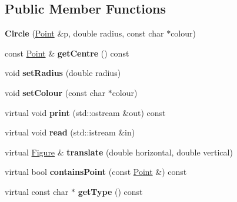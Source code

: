 \subsection*{Public Member Functions}
\begin{DoxyCompactItemize}
\item 
\mbox{\label{class_circle_a1eb7a4c2ac64b9c519539048e2f2c36b}} 
{\bfseries Circle} (\mbox{\hyperlink{struct_point}{Point}} \&p, double radius, const char $\ast$colour)
\item 
\mbox{\label{class_circle_a281c24ea848cd0f5eebfa0ca246925cc}} 
const \mbox{\hyperlink{struct_point}{Point}} \& {\bfseries get\+Centre} () const
\item 
\mbox{\label{class_circle_a7a1b334833a9f468498c804264553f41}} 
void {\bfseries set\+Radius} (double radius)
\item 
\mbox{\label{class_circle_a790c82d887375e72ad440dec8fa3fabb}} 
void {\bfseries set\+Colour} (const char $\ast$colour)
\item 
\mbox{\label{class_circle_a3b64810a362774c9951f44ecb3a0a6b2}} 
virtual void {\bfseries print} (std\+::ostream \&out) const
\item 
\mbox{\label{class_circle_aae11fbab6f6d0d9c058603884e5efefa}} 
virtual void {\bfseries read} (std\+::istream \&in)
\item 
\mbox{\label{class_circle_a986be9eb976eb4d3053c31ac6a97f5ee}} 
virtual \mbox{\hyperlink{class_figure}{Figure}} \& {\bfseries translate} (double horizontal, double vertical)
\item 
\mbox{\label{class_circle_a06ec8b5d93d259172d91c6891180c4a0}} 
virtual bool {\bfseries contains\+Point} (const \mbox{\hyperlink{struct_point}{Point}} \&) const
\item 
\mbox{\label{class_circle_a72be35cdf3ff005d8395ad9e84c197b6}} 
virtual const char $\ast$ {\bfseries get\+Type} () const
\item 
\mbox{\label{class_circle_afcea61557a14ea13df6831fa0ee42a3a}} 

\end{DoxyCompactItemize}
